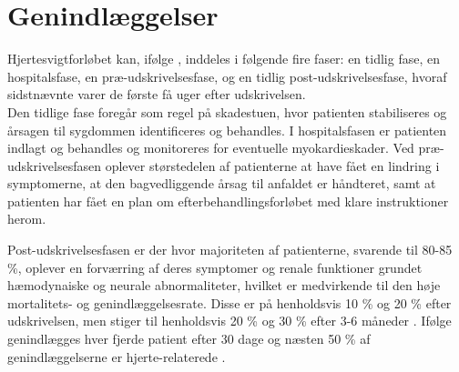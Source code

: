 \section{Genindlæggelser}

Hjertesvigtforløbet kan, ifølge \citet{Gheorghiade2009}, inddeles i følgende fire faser: en tidlig fase, en hospitalsfase, en præ-udskrivelsesfase, og en tidlig post-udskrivelsesfase, hvoraf sidstnævnte varer de første få uger efter udskrivelsen.\\
Den tidlige fase foregår som regel på skadestuen, hvor patienten stabiliseres og årsagen til sygdommen identificeres og behandles. I hospitalsfasen er patienten indlagt og behandles og monitoreres for eventuelle myokardieskader. Ved præ-udskrivelsesfasen oplever størstedelen af patienterne at have fået en lindring i symptomerne, at den bagvedliggende årsag til anfaldet er håndteret, samt at patienten har fået en plan om efterbehandlingsforløbet med klare instruktioner herom.

Post-udskrivelsesfasen er der hvor majoriteten af patienterne, svarende til 80-85 \%, oplever en forværring af deres symptomer og renale funktioner grundet hæmodynaiske og neurale abnormaliteter, hvilket er medvirkende til den høje mortalitets- og genindlæggelsesrate. \citep{Gheorghiade2009} Disse er på henholdsvis 10 \% og 20 \% efter udskrivelsen, men stiger til henholdsvis 20 \% og 30 \% efter 3-6 måneder \citep{GFonarow2007}. Ifølge \citet{Keenan2008} genindlægges hver fjerde patient efter 30 dage og næsten 50 \% af genindlæggelserne er hjerte-relaterede \citep{Gheorghiade2009}. %


